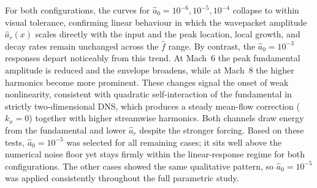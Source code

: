 
For both configurations, the curves for $\hat{a}_0 = 10^{-6}, 10^{-5}, 10^{-4}$ collapse to within visual tolerance, confirming linear behaviour in which the wavepacket amplitude $\hat{a}_r(x)$ scales directly with the input and the peak location, local growth, and decay rates remain unchanged across the $\hat{f}$ range. By contrast, the $\hat{a}_0 = 10^{-3}$ responses depart noticeably from this trend. At Mach~6 the peak fundamental amplitude is reduced and the envelope broadens, while at Mach~8 the higher harmonics become more prominent. These changes signal the onset of weak nonlinearity, consistent with quadratic self-interaction of the fundamental in strictly two-dimensional \gls{DNS}, which produces a steady mean-flow correction ($k_x = 0$) together with higher streamwise harmonics. Both channels draw energy from the fundamental and lower $\hat{a}_r$ despite the stronger forcing. Based on these tests, $\hat{a}_0 = 10^{-5}$ was selected for all remaining cases; it sits well above the numerical noise floor yet stays firmly within the linear-response regime for both configurations. The other cases showed the same qualitative pattern, so $\hat{a}_0 = 10^{-5}$ was applied consistently throughout the full parametric study.



